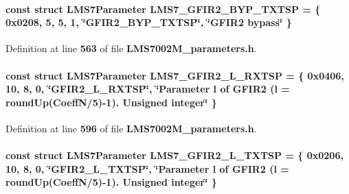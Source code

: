 \paragraph[{L\+M\+S7\+\_\+\+G\+F\+I\+R2\+\_\+\+B\+Y\+P\+\_\+\+T\+X\+T\+SP}]{\setlength{\rightskip}{0pt plus 5cm}const struct {\bf L\+M\+S7\+Parameter} L\+M\+S7\+\_\+\+G\+F\+I\+R2\+\_\+\+B\+Y\+P\+\_\+\+T\+X\+T\+SP = \{ 0x0208, 5, 5, 1, \char`\"{}\+G\+F\+I\+R2\+\_\+\+B\+Y\+P\+\_\+\+T\+X\+T\+S\+P\char`\"{}, \char`\"{}\+G\+F\+I\+R2 bypass\char`\"{} \}\hspace{0.3cm}{\ttfamily [static]}}\label{LMS7002M__parameters_8h_a8b69b487111115177e4efcffc61b97df}


Definition at line {\bf 563} of file {\bf L\+M\+S7002\+M\+\_\+parameters.\+h}.

\paragraph[{L\+M\+S7\+\_\+\+G\+F\+I\+R2\+\_\+\+L\+\_\+\+R\+X\+T\+SP}]{\setlength{\rightskip}{0pt plus 5cm}const struct {\bf L\+M\+S7\+Parameter} L\+M\+S7\+\_\+\+G\+F\+I\+R2\+\_\+\+L\+\_\+\+R\+X\+T\+SP = \{ 0x0406, 10, 8, 0, \char`\"{}\+G\+F\+I\+R2\+\_\+\+L\+\_\+\+R\+X\+T\+S\+P\char`\"{}, \char`\"{}\+Parameter l of G\+F\+I\+R2 (l = round\+Up(\+Coeff\+N/5)-\/1). Unsigned integer\char`\"{} \}\hspace{0.3cm}{\ttfamily [static]}}\label{LMS7002M__parameters_8h_adca915c8e038d4062361eb47a1afb59a}


Definition at line {\bf 596} of file {\bf L\+M\+S7002\+M\+\_\+parameters.\+h}.

\paragraph[{L\+M\+S7\+\_\+\+G\+F\+I\+R2\+\_\+\+L\+\_\+\+T\+X\+T\+SP}]{\setlength{\rightskip}{0pt plus 5cm}const struct {\bf L\+M\+S7\+Parameter} L\+M\+S7\+\_\+\+G\+F\+I\+R2\+\_\+\+L\+\_\+\+T\+X\+T\+SP = \{ 0x0206, 10, 8, 0, \char`\"{}\+G\+F\+I\+R2\+\_\+\+L\+\_\+\+T\+X\+T\+S\+P\char`\"{}, \char`\"{}\+Parameter l of G\+F\+I\+R2 (l = round\+Up(\+Coeff\+N/5)-\/1). Unsigned integer\char`\"{} \}\hspace{0.3cm}{\ttfamily [static]}}\label{LMS7002M__parameters_8h_a5f100e198dfeaf98bdc112453fd7903c}


